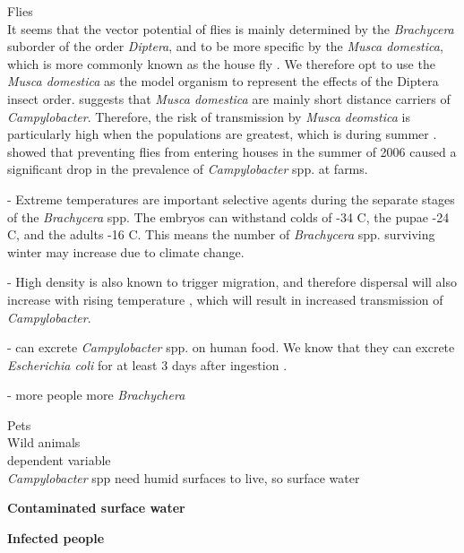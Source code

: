 \textcolor{AMAZINGPINK}{Flies} \\
It seems that the vector potential of flies is mainly determined by the \textit{Brachycera} suborder of the order \textit{Diptera}, and to be more specific by the \textit{Musca domestica}, which is more commonly known as the house fly \parencite{hald_influxed_2008}. We therefore opt to use the \textit{Musca domestica} as the model organism to represent the effects of the Diptera insect order. \cite{skovgard_retention_2011} suggests that \textit{Musca domestica} are mainly short distance carriers of \textit{Campylobacter}. Therefore, the risk of transmission by \textit{Musca deomstica} is particularly high when the populations are greatest, which is during summer \parencite{royden_role_2016}. \cite{hald_use_2007} showed that preventing flies from entering houses in the summer of 2006 caused a significant drop in the prevalence of \textit{Campylobacter} spp. at farms.


- Extreme temperatures are important selective agents during the separate stages of the \textit{Brachycera} spp. The embryos can withstand colds of -34 \degree C, the pupae -24 \degree C, and the adults -16 \degree C.  This means the number of \textit{Brachycera} spp. surviving winter may increase due to climate change.

- High density is also known to trigger migration, and therefore dispersal will also increase with rising temperature \parencite{feder_locomotion_2010}, which will result in increased transmission of \textit{Campylobacter}.

-  can excrete \textit{Campylobacter} spp. on human food. We know that they can excrete \textit{Escherichia coli} for at least 3 days after ingestion \parencite{sasaki_epidemiological_2000}.

- more people \xrightarrow[]{} more \textit{Brachychera}

\textcolor{AMAZINGPINK}{Pets} \\

\textcolor{AMAZINGPINK}{Wild animals} \\

\textcolor{AMAZINGPINK}{dependent variable} \\
\textit{Campylobacter} spp need humid surfaces to live, so surface water %


\textbf{Contaminated surface water}

\textbf{Infected people}

